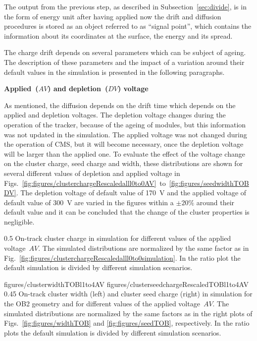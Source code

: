 The output from the previous step, as described in Subsection~\ref{sec:divide}, is in the form of energy unit after having applied now the drift and diffusion procedures is stored as an object referred to as ``signal point'', which contains the information about its coordinates at the surface, the energy and its spread.

The charge drift depends on several parameters which can be subject of ageing. The description of these parameters and the impact of a variation around their default values in the  simulation is presented in the following paragraphs.

\textbf{Applied~($AV$) and depletion~($DV$) voltage}

As mentioned, the diffusion depends on the drift time which depends on the applied and depletion voltages. The depletion voltage changes during the operation of the tracker, because of the ageing of modules, but this information was not updated in the simulation. The applied voltage was not changed during the operation of CMS, but it will become necessary, once the depletion voltage will be larger than the applied one. To evaluate the effect of the voltage change on the cluster charge, seed charge and width, these distributions are shown for several different values of depletion and applied voltage in Figs.~\ref{fig:figures/clusterchargeRescaledalll0to0AV}~to~\ref{fig:figures/seedwidthTOBDV}. The depletion voltage of default value of 170~V and the applied voltage of default value of 300~V are varied in the figures within a $\pm 20\%$ around their default value and it can be concluded that the change of the cluster properties is negligible.


                 {0.5}       %
                 { On-track cluster charge in simulation for different values of the applied voltage~$AV$.  The simulated distributions are normalized by the same factor as in Fig.~\ref{fig:figures/clusterchargeRescaledalll0to0simulation}. In the ratio plot the default simulation is divided by different simulation scenarios. }

                 {figures/clusterwidthTOBl1to4AV}
                 {figures/clusterseedchargeRescaledTOBl1to4AV} %
                 {0.45}       %
                 {  On-track cluster width (left) and cluster seed charge (right) in simulation  for the OB2 geometry and for different values of the applied voltage~$AV$. The simulated distributions are normalized by the same factors as in the right plots of Figs.~\ref{fig:figures/widthTOB} and \ref{fig:figures/seedTOB}, respectively.   In the ratio plots the default simulation is divided by different simulation scenarios. }


